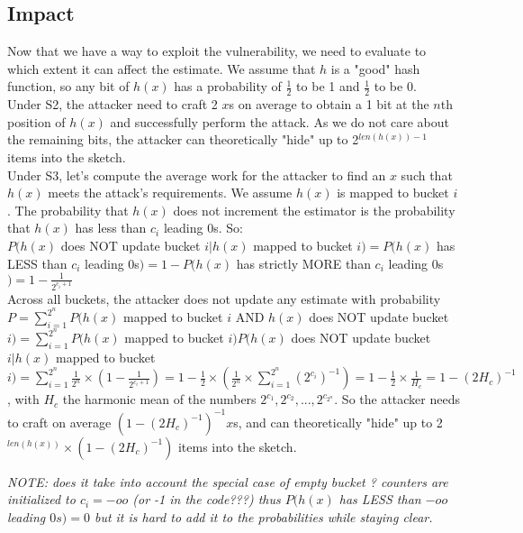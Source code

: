 \documentclass{IEEEtran}
\begin{document}
\subsection{Impact}
Now that we have a way to exploit the vulnerability, we need to evaluate to which extent it can affect the estimate. We assume that $h$ is a "good" hash function, so any bit of $h(x)$ has a probability of $\frac{1}{2}$ to be 1 and $\frac{1}{2}$ to be 0.\\

Under S2, the attacker need to craft 2 $x$s on average to obtain a 1 bit at the $n$th position of $h(x)$ and successfully perform the attack. As we do not care about the remaining bits, the attacker can theoretically "hide" up to 2$^{len(h(x))-1}$ items into the sketch.\\

Under S3, let's compute the average work for the attacker to find an $x$ such that $h(x)$ meets the attack's requirements. We assume $h(x)$ is mapped to bucket $i$. The probability that $h(x)$ does not increment the estimator is the probability that $h(x)$ has less than $c_i$ leading 0s. So:\\
$P(h(x)$ does NOT update bucket $i| h(x)$ mapped to bucket $i)=P(h(x)$ has LESS than $c_i$ leading 0s$)=1-P(h(x)$ has strictly MORE than $c_i$ leading 0s$)=1-\frac{1}{2^{c_i+1}}$\\
Across all buckets, the attacker does not update any estimate with probability $P=
\sum_{i=1}^{2^n}P(h(x)$ mapped to bucket $i$ AND $h(x)$ does NOT update bucket $i) = \sum_{i=1}^{2^n}P(h(x)$ mapped to bucket $i)P(h(x)$ does NOT update bucket $i| h(x)$ mapped to bucket $i) = \sum_{i=1}^{2^n}\frac{1}{2^n} \times (1-\frac{1}{2^{c_i+1}}) = 1-\frac{1}{2}\times(\frac{1}{2^n}\times \sum_{i=1}^{2^n} {(2^{c_i})}^{-1}) = 1-\frac{1}{2}\times\frac{1}{H_c} = 1-(2H_c)^{-1}$, with $H_c$ the harmonic mean of the numbers $2^{c_1}, 2^{c_2}, ..., 2^{c_{2^n}}$.
So the attacker needs to craft on average $(1-(2H_c)^{-1})^{-1} x$s, and can theoretically "hide" up to 2$^{len(h(x))}\times (1-(2H_c)^{-1})$ items into the sketch.

\textit{NOTE: does it take into account the special case of empty bucket ? counters are initialized to $c_i=-oo$ (or -1 in the code???) thus $P(h(x)$ has LESS than $-oo$ leading $0s) = 0$ but it is hard to add it to the probabilities while staying clear.}\\
\end{document}
